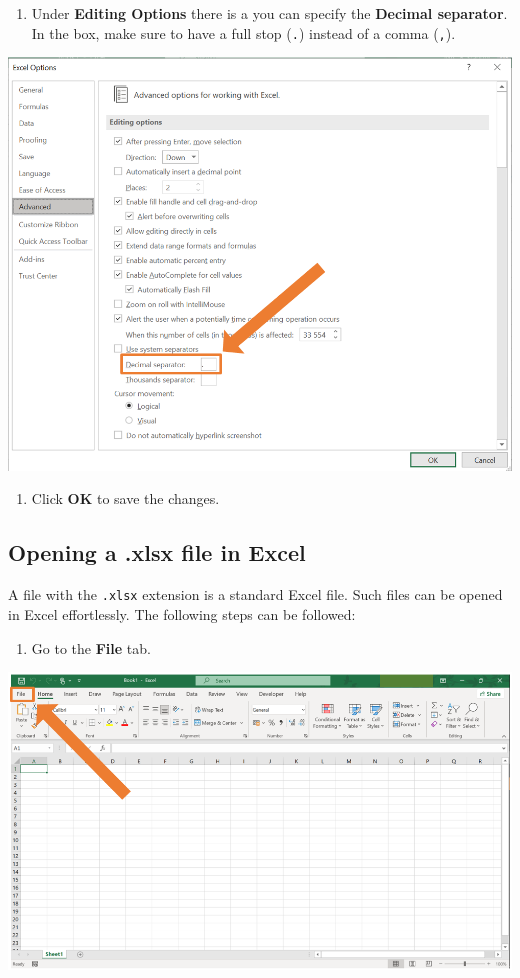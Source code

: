 \documentclass[
]{book}
\providecommand{\tightlist}{%
  \setlength{\itemsep}{0pt}\setlength{\parskip}{0pt}}
\begin{document}
\begin{enumerate}
\def\labelenumi{\arabic{enumi}.}
\setcounter{enumi}{3}
\tightlist
\item
  Under \textbf{Editing Options} there is a you can specify the \textbf{Decimal separator}. In the box, make sure to have a full stop (\texttt{.}) instead of a comma (\texttt{,}).
\end{enumerate}

\begin{center}\includegraphics[width=0.6\linewidth]{Figures/Decimal_step4} \end{center}

\begin{enumerate}
\def\labelenumi{\arabic{enumi}.}
\setcounter{enumi}{4}
\tightlist
\item
  Click \textbf{OK} to save the changes.
\end{enumerate}

\subsection{Opening a .xlsx file in Excel}\label{opening-a-.xlsx-file-in-excel}

A file with the \texttt{.xlsx} extension is a standard Excel file. Such files can be opened in Excel effortlessly. The following steps can be followed:

\begin{enumerate}
\def\labelenumi{\arabic{enumi}.}
\tightlist
\item
  Go to the \textbf{File} tab.
\end{enumerate}

\begin{center}\includegraphics[width=0.6\linewidth]{Figures/decimal_step1} \end{center}
\end{document}
